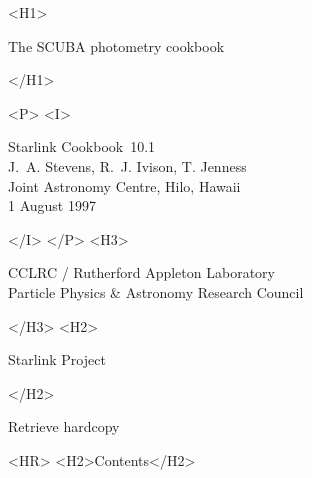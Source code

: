 \documentclass[twoside,11pt,fleqn]{article}
\newcommand{\stardoccategory}  {Starlink Cookbook}
\newcommand{\stardocsource}    {sc\stardocnumber}
\newcommand{\stardocnumber}    {10.1}
\newcommand{\stardocauthors}   {J.~A. Stevens, R.~J. Ivison, T. Jenness\\
                                Joint Astronomy Centre, Hilo, Hawaii}
\newcommand{\stardocdate}      {1 August 1997}
\newcommand{\stardoctitle}     {The SCUBA photometry cookbook}
\newcommand{\stardocversion}   {\ }
\newcommand{\stardocmanual}    {\ }
\newcommand{\htmladdnormallink}[2]{#1}
\newcommand{\htmladdimg}[1]{}
\newcommand{\htmlref}[2]{#1}
\newcommand{\htmladdtonavigation}[1]{}
\newcommand{\xlabel}[1]{}
\newcommand{\latexonlytoc}[0]{\tableofcontents}
\begin{document}
\begin{htmlonly}
   \xlabel{}
   \begin{rawhtml} <H1> \end{rawhtml}
      \stardoctitle\\
   \begin{rawhtml} </H1> \end{rawhtml}


   \begin{rawhtml} <P> <I> \end{rawhtml}
   \stardoccategory\ \stardocnumber \\
   \stardocauthors \\
   \stardocdate
   \begin{rawhtml} </I> </P> <H3> \end{rawhtml}
      \htmladdnormallink{CCLRC}{http://www.cclrc.ac.uk} /
      \htmladdnormallink{Rutherford Appleton Laboratory}
                        {http://www.cclrc.ac.uk/ral} \\
      \htmladdnormallink{Particle Physics \& Astronomy Research Council}
                        {http://www.pparc.ac.uk} \\
   \begin{rawhtml} </H3> <H2> \end{rawhtml}
      \htmladdnormallink{Starlink Project}{http://www.starlink.ac.uk/}
   \begin{rawhtml} </H2> \end{rawhtml}
   \htmladdnormallink{\htmladdimg{source.gif} Retrieve hardcopy}
      {http://www.starlink.ac.uk/cgi-bin/hcserver?\stardocsource}\\

  \label{stardoccontents}
  \begin{rawhtml}
    <HR>
    <H2>Contents</H2>
  \end{rawhtml}
  \newcommand{\latexonlytoc}[0]{}
  \htmladdtonavigation{\htmlref{\htmladdimg{contents_motif.gif}}
        {stardoccontents}}

\end{htmlonly}
\end{document}
